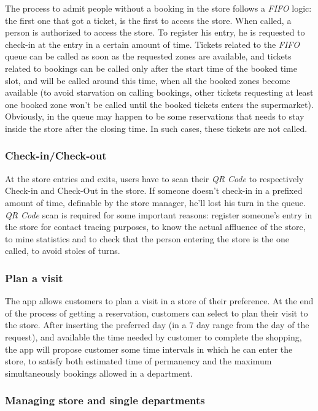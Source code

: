 \documentclass{article}
\begin{document}
		The process to admit people without a booking in the store follows a \emph{FIFO} logic: the first one that got a ticket, is the first to access the store. When called, a person is authorized to access the store. To register his entry, he is requested to check-in at the entry in a certain amount of time. Tickets related to the \emph{FIFO} queue can be called as soon as the requested zones are available, and tickets related to bookings can be called only after the start time of the booked time slot, and will be called around this time, when all the booked zones become available (to avoid starvation on calling bookings, other tickets requesting at least one booked zone won't be called until the booked tickets enters the supermarket). Obviously, in the queue may happen to be some reservations that needs to stay inside the store after the closing time. In such cases, these tickets are not called.
		
		\subsubsection{Check-in/Check-out}
		
		At the store entries and exits, users have to scan their \emph{QR Code} to respectively Check-in and Check-Out in the store. If someone doesn't check-in in a prefixed amount of time, definable by the store manager, he'll lost his turn in the queue. \emph{QR Code} scan is required for some important reasons: register someone's entry in the store for contact tracing purposes, to know the actual affluence of the store, to mine statistics and to check that the person entering the store is the one called, to avoid stoles of turns.
		
		\subsubsection{Plan a visit}
		
		The app allows customers to plan a visit in a store of their preference. At the end of the process of getting a reservation, customers can select to plan their visit to the store. After inserting the preferred day (in a 7 day range from the day of the request), and available the time needed by customer to complete the shopping, the app will propose customer some time intervals in which he can enter the store, to satisfy both estimated time of permanency and the maximum simultaneously bookings allowed in a department. 
		
		\subsubsection{Managing store and single departments}
		
\end{document}
